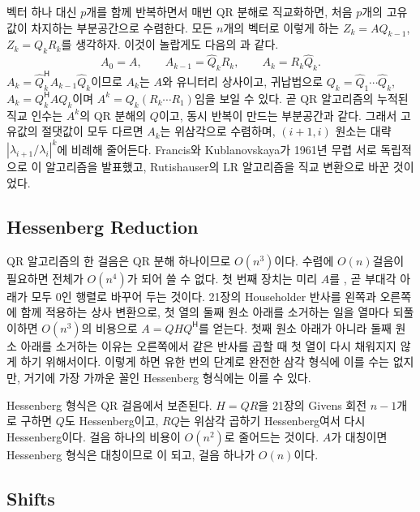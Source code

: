벡터 하나 대신 $p$개를 함께 반복하면서 매번 QR 분해로 직교화하면, 처음 $p$개의 고유값이 차지하는 부분공간으로 수렴한다. 모든 $n$개의 벡터로 이렇게 하는  $Z_k=AQ_{k-1}$, $Z_k=Q_kR_k$를 생각하자. 이것이 놀랍게도 다음의 과 같다.
\[
A_0=A,\qquad A_{k-1}=\hat Q_kR_k,\qquad A_k=R_k\hat Q_k.
\]
$A_k=\hat Q_k^{\mathsf H}A_{k-1}\hat Q_k$이므로 $A_k$는 $A$와 유니터리 상사이고, 귀납법으로 $Q_k=\hat Q_1\cdots\hat Q_k$, $A_k=Q_k^{\mathsf H}AQ_k$이며 $A^k=Q_k(R_k\cdots R_1)$임을 보일 수 있다. 곧 QR 알고리즘의 누적된 직교 인수는 $A^k$의 QR 분해의 $Q$이고, 동시 반복이 만드는 부분공간과 같다. 그래서 고유값의 절댓값이 모두 다르면 $A_k$는 위삼각으로 수렴하며, $(i+1,i)$ 원소는 대략 $|\lambda_{i+1}/\lambda_i|^k$에 비례해 줄어든다. Francis와 Kublanovskaya가 1961년 무렵 서로 독립적으로 이 알고리즘을 발표했고\cite{francis1961,kublanovskaya1962}, Rutishauser의 LR 알고리즘\cite{rutishauser1958}을 직교 변환으로 바꾼 것이었다.

\subsection{Hessenberg Reduction}

QR 알고리즘의 한 걸음은 QR 분해 하나이므로 $O(n^3)$이다. 수렴에 $O(n)$걸음이 필요하면 전체가 $O(n^4)$가 되어 쓸 수 없다. 첫 번째 장치는 미리 $A$를 , 곧 부대각 아래가 모두 $0$인 행렬로 바꾸어 두는 것이다. 21장의 Householder 반사를 왼쪽과 오른쪽에 함께 적용하는 상사 변환으로, 첫 열의 둘째 원소 아래를 소거하는 일을 열마다 되풀이하면 $O(n^3)$의 비용으로 $A=QHQ^{\mathsf H}$를 얻는다. 첫째 원소 아래가 아니라 둘째 원소 아래를 소거하는 이유는 오른쪽에서 같은 반사를 곱할 때 첫 열이 다시 채워지지 않게 하기 위해서이다. 이렇게 하면 유한 번의 단계로 완전한 삼각 형식에 이를 수는 없지만, 거기에 가장 가까운 꼴인 Hessenberg 형식에는 이를 수 있다.

Hessenberg 형식은 QR 걸음에서 보존된다. $H=QR$을 21장의 Givens 회전 $n-1$개로 구하면 $Q$도 Hessenberg이고, $RQ$는 위삼각 곱하기 Hessenberg여서 다시 Hessenberg이다. 걸음 하나의 비용이 $O(n^2)$로 줄어드는 것이다. $A$가 대칭이면 Hessenberg 형식은 대칭이므로 이 되고, 걸음 하나가 $O(n)$이다.

\subsection{Shifts}

